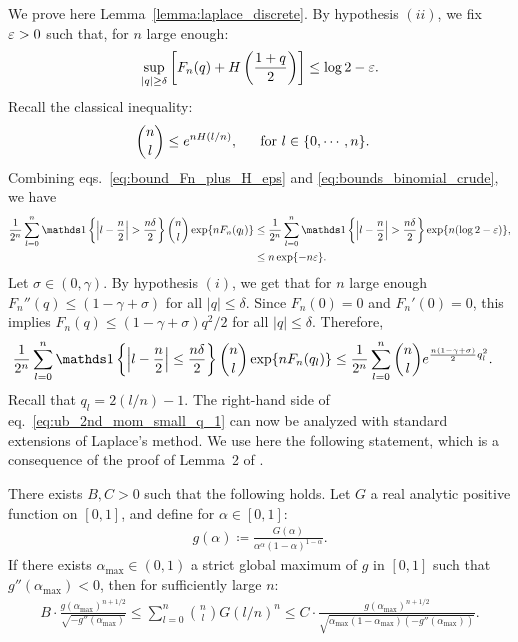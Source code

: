 We prove here Lemma~\ref{lemma:laplace_discrete}.
By hypothesis $(ii)$, we fix $\varepsilon > 0$ such that, for $n$ large enough:
\begin{equation}
    \label{eq:bound_Fn_plus_H_eps}
    \sup_{|q| \geq \delta} \left[F_n(q) + H\left(\frac{1+q}{2}\right) \right] \leq \log 2 - \varepsilon.
\end{equation}
Recall the classical inequality:
\begin{align}
    \label{eq:bounds_binomial_crude}
  \binom{n}{l} \leq e^{n H(l/n)}, \hspace{0.5cm} &\textrm{ for } l \in \{0,\cdots, n\}.
\end{align}
Combining eqs.~\eqref{eq:bound_Fn_plus_H_eps} and \eqref{eq:bounds_binomial_crude}, we have 
\begin{align}
    \nonumber
    \frac{1}{2^n}\sum_{l=0}^n \indi\left\{\left|l - \frac{n}{2}\right| > \frac{n \delta}{2}\right\} \binom{n}{l} \exp\{n F_n(q_l)\}
    &\leq \frac{1}{2^n}\sum_{l=0}^n \indi\left\{\left|l - \frac{n}{2}\right|> \frac{n \delta}{2}\right\} \exp\{n(\log 2  - \eps)\}, \\ 
    \label{eq:ub_2nd_mom_large_q}
    &\leq n \exp\{- n \eps\}.
\end{align}
Let $\sigma \in (0, \gamma)$.
By hypothesis $(i)$, we get that for $n$ large enough 
$F_n''(q)\leq(1-\gamma+\sigma)$ for all $|q| \leq \delta$.
Since $F_n(0) = 0$ and $F_n'(0) = 0$, this implies
$F_n(q)\leq(1-\gamma+\sigma) q^2/2$ for all $|q| \leq \delta$.
Therefore,
\begin{align}
    \label{eq:ub_2nd_mom_small_q_1}
    \frac{1}{2^n}\sum_{l=0}^n \indi\left\{\left|l - \frac{n}{2}\right| \leq \frac{n \delta}{2}\right\} \binom{n}{l} \exp\{n F_n(q_l)\}
    &\leq \frac{1}{2^n} \sum_{l=0}^n \binom{n}{l} e^{\frac{n(1-\gamma+\sigma)}{2} q_l^2}.
\end{align}
Recall that $q_l = 2 (l/n) - 1$.
The right-hand side of eq.~\eqref{eq:ub_2nd_mom_small_q_1} can now be analyzed with standard extensions of Laplace's method. 
We use here the following statement, which is a consequence of the proof of Lemma~2 of \cite{achlioptas2002asymptotic}.
\begin{lemma}
    \label{lemma:achlioptas}
    There exists $B, C > 0$ such that the following holds.
    Let $G$  a real analytic positive function on $[0,1]$, and define for $\alpha \in [0,1]$: 
    \begin{align*}
        g(\alpha) \coloneqq \frac{G(\alpha)}{\alpha^\alpha (1-\alpha)^{1-\alpha}}. 
    \end{align*} 
    If there exists $\alpha_{\max} \in (0,1)$ a strict global maximum of $g$ in $[0,1]$ such that $g''(\alpha_{\max}) < 0$, then for sufficiently large $n$: 
    \begin{align*}
        B \cdot\frac{g(\alpha_{\max})^{n+1/2}}{\sqrt{-g''(\alpha_{\max})}} \leq \sum_{l=0}^n \binom{n}{l} G(l/n)^n\leq C \cdot \frac{g(\alpha_{\max})^{n+1/2}}{\sqrt{\alpha_{\max}(1-\alpha_{\max})(-g''(\alpha_{\max}))}}.
    \end{align*}
\end{lemma}
